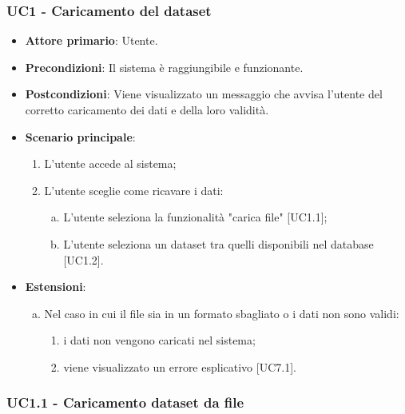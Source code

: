 \subsubsection{UC1 - Caricamento del dataset}

\begin{figure}[h]
\centering
\end{figure}


\begin{itemize}
	\item \textbf{Attore primario}: Utente.
	\item \textbf{Precondizioni}: Il sistema è raggiungibile e funzionante.
	\item \textbf{Postcondizioni}: Viene visualizzato un messaggio che avvisa l'utente del corretto caricamento dei dati e della loro validità.
	\item \textbf{Scenario principale}:
		\begin{enumerate}
			\item L'utente accede al sistema;
			\item L'utente sceglie come ricavare i dati:
				\begin{enumerate}[(a)]
			\item L'utente seleziona la funzionalità "carica file" [UC1.1];
			\item L'utente seleziona un dataset tra quelli disponibili nel database [UC1.2].
				\end{enumerate}
		\end{enumerate}
	\item \textbf{Estensioni}:
	\begin{enumerate}[(a)]
		\item Nel caso in cui il file sia in un formato sbagliato o i dati non sono validi:
		\begin{enumerate}[1.]
			\item i dati non vengono caricati nel sistema;
			\item viene visualizzato un errore esplicativo [UC7.1].
		\end{enumerate}
	\end{enumerate}
\end{itemize}

\subsubsection{UC1.1 - Caricamento dataset da file}

